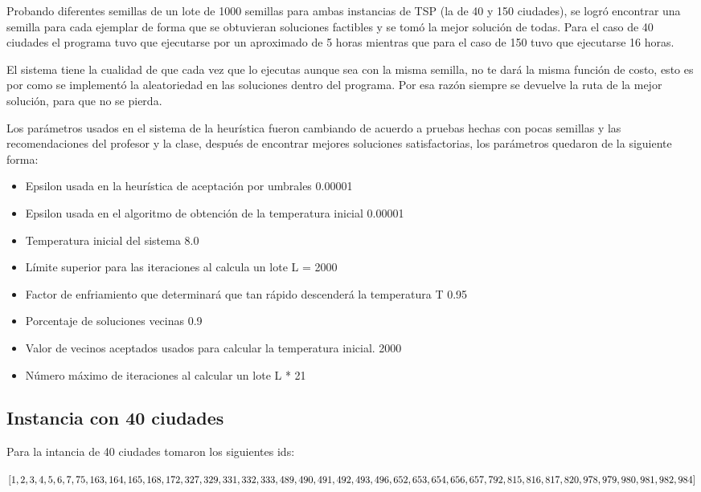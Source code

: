 \documentclass{article}
\begin{document}
Probando diferentes semillas de un lote de 1000 semillas para ambas instancias de TSP (la de 40 y 150 ciudades), se logró encontrar una semilla para cada ejemplar de forma que se obtuvieran soluciones factibles y se tomó la mejor solución de todas. Para el caso de 40 ciudades el programa tuvo que ejecutarse por un aproximado de 5 horas mientras que para el caso de 150 tuvo que ejecutarse 16 horas.

El sistema tiene la cualidad de que cada vez que lo ejecutas aunque sea con la misma semilla, no te dará la misma función de costo, esto es por como se implementó la aleatoriedad en las soluciones dentro del programa. Por esa razón siempre se devuelve la ruta de la mejor solución, para que no se pierda. 

Los parámetros usados en el sistema de la heurística fueron cambiando de acuerdo a pruebas hechas con pocas semillas y las recomendaciones del profesor y la clase, después de encontrar mejores soluciones satisfactorias, los parámetros quedaron de la siguiente forma:
\begin{itemize}
\item Epsilon usada en la heurística de aceptación por umbrales 
0.00001
\item Epsilon usada en el algoritmo de obtención de la temperatura inicial
0.00001
\item Temperatura inicial del sistema 
8.0
\item Límite superior para las iteraciones al calcula un lote 
L = 2000
\item Factor de enfriamiento que determinará que tan rápido descenderá la temperatura T 
0.95
\item Porcentaje de soluciones vecinas
0.9
\item Valor de vecinos aceptados usados para calcular la temperatura inicial.
2000
\item Número máximo de iteraciones al calcular un lote 
L * 21
\end{itemize}

\subsection{Instancia con 40 ciudades}

Para la intancia de 40 ciudades tomaron los siguientes ids:

$[1,2,3,4,5,6,7,75,163,164,165,168,172,327,329,331,332,333,489,490,491,492,493,496,652,653,654, 656,657,\\ 792,815,816,817,820,978,979,980,981,982,984]$
\end{document}
